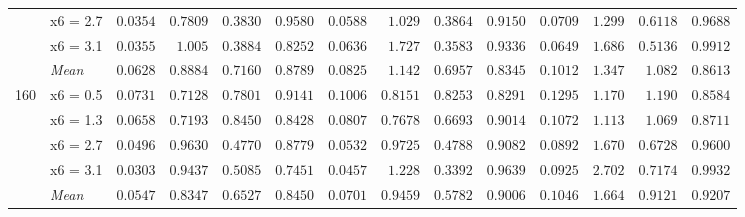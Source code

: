\begin{table}[htbp]
\begin{tabular}{llrrrrrrrrrrrr}
 & x6 = 2.7 & {\boldmath$0.0354$} & {\boldmath$0.7809$} & {\boldmath$0.3830$} & {\boldmath$0.9580$} & $0.0588$ & $1.029$ & $0.3864$ & $0.9150$ & $0.0709$ & $1.299$ & $0.6118$ & $0.9688$ \\
 & x6 = 3.1 & {\boldmath$0.0355$} & {\boldmath$1.005$} & $0.3884$ & $0.8252$ & $0.0636$ & $1.727$ & {\boldmath$0.3583$} & {\boldmath$0.9336$} & $0.0649$ & $1.686$ & $0.5136$ & $0.9912$ \\
 & \textit{Mean} & \colorbox{green!20}{\boldmath$0.0628$} & \colorbox{green!20}{\boldmath$0.8884$} & $0.7160$ & \colorbox{green!20}{\boldmath$0.8789$} & $0.0825$ & $1.142$ & \colorbox{green!20}{\boldmath$0.6957$} & $0.8345$ & $0.1012$ & $1.347$ & $1.082$ & $0.8613$ \\
\midrule
\multirow{5}{*}{160} & x6 = 0.5 & {\boldmath$0.0731$} & {\boldmath$0.7128$} & {\boldmath$0.7801$} & {\boldmath$0.9141$} & $0.1006$ & $0.8151$ & $0.8253$ & $0.8291$ & $0.1295$ & $1.170$ & $1.190$ & $0.8584$ \\
 & x6 = 1.3 & {\boldmath$0.0658$} & {\boldmath$0.7193$} & $0.8450$ & $0.8428$ & $0.0807$ & $0.7678$ & {\boldmath$0.6693$} & {\boldmath$0.9014$} & $0.1072$ & $1.113$ & $1.069$ & $0.8711$ \\
 & x6 = 2.7 & {\boldmath$0.0496$} & {\boldmath$0.9630$} & {\boldmath$0.4770$} & $0.8779$ & $0.0532$ & $0.9725$ & $0.4788$ & $0.9082$ & $0.0892$ & $1.670$ & $0.6728$ & {\boldmath$0.9600$} \\
 & x6 = 3.1 & {\boldmath$0.0303$} & {\boldmath$0.9437$} & $0.5085$ & $0.7451$ & $0.0457$ & $1.228$ & {\boldmath$0.3392$} & {\boldmath$0.9639$} & $0.0925$ & $2.702$ & $0.7174$ & $0.9932$ \\
 & \textit{Mean} & \colorbox{green!20}{\boldmath$0.0547$} & \colorbox{green!20}{\boldmath$0.8347$} & $0.6527$ & $0.8450$ & $0.0701$ & $0.9459$ & \colorbox{green!20}{\boldmath$0.5782$} & $0.9006$ & $0.1046$ & $1.664$ & $0.9121$ & \colorbox{green!20}{\boldmath$0.9207$} \\
\bottomrule
\end{tabular}
\end{table}
